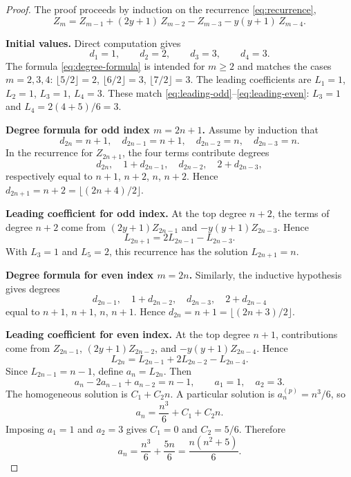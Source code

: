 \begin{proof}
The proof proceeds by induction on the recurrence \eqref{eq:recurrence},
\[
Z_m = Z_{m-1} + (2y+1)\,Z_{m-2} - Z_{m-3} - y(y+1)\,Z_{m-4}.
\]

\noindent\textbf{Initial values.}
Direct computation gives
\[
d_1 = 1, \qquad d_2 = 2, \qquad d_3 = 3, \qquad d_4 = 3.
\]
The formula \eqref{eq:degree-formula} is intended for $m \ge 2$ and matches the cases $m=2,3,4$:
$\lfloor 5/2 \rfloor = 2$, $\lfloor 6/2 \rfloor = 3$, $\lfloor 7/2 \rfloor = 3$.
The leading coefficients are $L_1 = 1$, $L_2 = 1$, $L_3 = 1$, $L_4 = 3$.
These match \eqref{eq:leading-odd}--\eqref{eq:leading-even}: $L_3 = 1$ and $L_4 = 2(4+5)/6 = 3$.

\medskip
\noindent\textbf{Degree formula for odd index $m = 2n+1$.}
Assume by induction that
\[
d_{2n} = n+1, \quad d_{2n-1} = n+1, \quad d_{2n-2} = n, \quad d_{2n-3} = n.
\]
In the recurrence for $Z_{2n+1}$, the four terms contribute degrees
\[
d_{2n},\quad 1 + d_{2n-1},\quad d_{2n-2},\quad 2 + d_{2n-3},
\]
respectively equal to $n+1$, $n+2$, $n$, $n+2$.
Hence $d_{2n+1} = n + 2 = \lfloor (2n+4)/2 \rfloor$.

\medskip
\noindent\textbf{Leading coefficient for odd index.}
At the top degree $n+2$, the terms of degree $n+2$ come from $(2y+1)Z_{2n-1}$ and $-y(y+1)Z_{2n-3}$.
Hence
\begin{equation}\label{eq:L-odd-recurrence}
L_{2n+1} = 2L_{2n-1} - L_{2n-3}.
\end{equation}
With $L_3 = 1$ and $L_5 = 2$, this recurrence has the solution $L_{2n+1} = n$.

\medskip
\noindent\textbf{Degree formula for even index $m = 2n$.}
Similarly, the inductive hypothesis gives degrees
\[
d_{2n-1},\quad 1 + d_{2n-2},\quad d_{2n-3},\quad 2 + d_{2n-4}
\]
equal to $n+1$, $n+1$, $n$, $n+1$.
Hence $d_{2n} = n+1 = \lfloor(2n+3)/2\rfloor$.

\medskip
\noindent\textbf{Leading coefficient for even index.}
At the top degree $n+1$, contributions come from $Z_{2n-1}$, $(2y+1)Z_{2n-2}$, and $-y(y+1)Z_{2n-4}$.
Hence
\begin{equation}\label{eq:L-even-recurrence}
L_{2n} = L_{2n-1} + 2L_{2n-2} - L_{2n-4}.
\end{equation}
Since $L_{2n-1}=n-1$, define $a_n = L_{2n}$.
Then
\begin{equation}\label{eq:a-recurrence}
a_n - 2a_{n-1} + a_{n-2} = n - 1,
\qquad a_1 = 1, \quad a_2 = 3.
\end{equation}
The homogeneous solution is $C_1 + C_2 n$.
A particular solution is $a_n^{(p)} = n^3/6$, so
\[
a_n = \frac{n^3}{6} + C_1 + C_2 n.
\]
Imposing $a_1 = 1$ and $a_2 = 3$ gives $C_1 = 0$ and $C_2 = 5/6$.
Therefore
\[
a_n = \frac{n^3}{6} + \frac{5n}{6} = \frac{n(n^2 + 5)}{6}.
\]
\end{proof}

